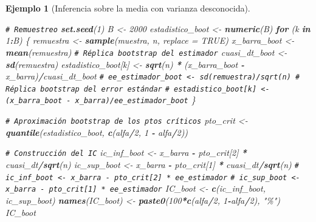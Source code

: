 \documentclass[
]{book}
\newenvironment{Shaded}{\begin{snugshade}}{\end{snugshade}}
\newcommand{\AttributeTok}[1]{\textcolor[rgb]{0.13,0.29,0.53}{#1}}
\newcommand{\CommentTok}[1]{\textcolor[rgb]{0.56,0.35,0.01}{\textit{#1}}}
\newcommand{\ConstantTok}[1]{\textcolor[rgb]{0.56,0.35,0.01}{#1}}
\newcommand{\ControlFlowTok}[1]{\textcolor[rgb]{0.13,0.29,0.53}{\textbf{#1}}}
\newcommand{\DecValTok}[1]{\textcolor[rgb]{0.00,0.00,0.81}{#1}}
\newcommand{\FunctionTok}[1]{\textcolor[rgb]{0.13,0.29,0.53}{\textbf{#1}}}
\newcommand{\NormalTok}[1]{#1}
\newcommand{\OtherTok}[1]{\textcolor[rgb]{0.56,0.35,0.01}{#1}}
\newcommand{\SpecialCharTok}[1]{\textcolor[rgb]{0.81,0.36,0.00}{\textbf{#1}}}
\newcommand{\StringTok}[1]{\textcolor[rgb]{0.31,0.60,0.02}{#1}}
\theoremstyle{break}
\newtheorem{example}{Ejemplo}[chapter]
\theoremstyle{nonumberplain}
\renewcommand{\CommentTok}[1]{\textcolor[rgb]{0.41,0.41,0.41}{\texttt{#1}}}
\begin{document}
\begin{example}[Inferencia sobre la media con varianza desconocida]
\begin{Shaded}
\begin{Highlighting}[]
\CommentTok{\# Remuestreo}
\FunctionTok{set.seed}\NormalTok{(}\DecValTok{1}\NormalTok{)}
\NormalTok{B }\OtherTok{\textless{}{-}} \DecValTok{2000}
\NormalTok{estadistico\_boot }\OtherTok{\textless{}{-}} \FunctionTok{numeric}\NormalTok{(B)}
\ControlFlowTok{for}\NormalTok{ (k }\ControlFlowTok{in} \DecValTok{1}\SpecialCharTok{:}\NormalTok{B) \{}
\NormalTok{  remuestra }\OtherTok{\textless{}{-}} \FunctionTok{sample}\NormalTok{(muestra, n, }\AttributeTok{replace =} \ConstantTok{TRUE}\NormalTok{)}
\NormalTok{  x\_barra\_boot }\OtherTok{\textless{}{-}} \FunctionTok{mean}\NormalTok{(remuestra) }\CommentTok{\# Réplica bootstrap del estimador}
\NormalTok{  cuasi\_dt\_boot }\OtherTok{\textless{}{-}} \FunctionTok{sd}\NormalTok{(remuestra)}
\NormalTok{  estadistico\_boot[k] }\OtherTok{\textless{}{-}} \FunctionTok{sqrt}\NormalTok{(n) }\SpecialCharTok{*}\NormalTok{ (x\_barra\_boot }\SpecialCharTok{{-}}\NormalTok{ x\_barra)}\SpecialCharTok{/}\NormalTok{cuasi\_dt\_boot}
  \CommentTok{\# ee\_estimador\_boot \textless{}{-} sd(remuestra)/sqrt(n) \# Réplica bootstrap del error estándar}
  \CommentTok{\# estadistico\_boot[k] \textless{}{-} (x\_barra\_boot {-} x\_barra)/ee\_estimador\_boot}
\NormalTok{\}}

\CommentTok{\# Aproximación bootstrap de los ptos críticos}
\NormalTok{pto\_crit }\OtherTok{\textless{}{-}} \FunctionTok{quantile}\NormalTok{(estadistico\_boot, }\FunctionTok{c}\NormalTok{(alfa}\SpecialCharTok{/}\DecValTok{2}\NormalTok{, }\DecValTok{1} \SpecialCharTok{{-}}\NormalTok{ alfa}\SpecialCharTok{/}\DecValTok{2}\NormalTok{))}

\CommentTok{\# Construcción del IC}
\NormalTok{ic\_inf\_boot }\OtherTok{\textless{}{-}}\NormalTok{ x\_barra }\SpecialCharTok{{-}}\NormalTok{ pto\_crit[}\DecValTok{2}\NormalTok{] }\SpecialCharTok{*}\NormalTok{ cuasi\_dt}\SpecialCharTok{/}\FunctionTok{sqrt}\NormalTok{(n)}
\NormalTok{ic\_sup\_boot }\OtherTok{\textless{}{-}}\NormalTok{ x\_barra }\SpecialCharTok{{-}}\NormalTok{ pto\_crit[}\DecValTok{1}\NormalTok{] }\SpecialCharTok{*}\NormalTok{ cuasi\_dt}\SpecialCharTok{/}\FunctionTok{sqrt}\NormalTok{(n)}
\CommentTok{\# ic\_inf\_boot \textless{}{-} x\_barra {-} pto\_crit[2] * ee\_estimador}
\CommentTok{\# ic\_sup\_boot \textless{}{-} x\_barra {-} pto\_crit[1] * ee\_estimador}
\NormalTok{IC\_boot }\OtherTok{\textless{}{-}} \FunctionTok{c}\NormalTok{(ic\_inf\_boot, ic\_sup\_boot)}
\FunctionTok{names}\NormalTok{(IC\_boot) }\OtherTok{\textless{}{-}} \FunctionTok{paste0}\NormalTok{(}\DecValTok{100}\SpecialCharTok{*}\FunctionTok{c}\NormalTok{(alfa}\SpecialCharTok{/}\DecValTok{2}\NormalTok{, }\DecValTok{1}\SpecialCharTok{{-}}\NormalTok{alfa}\SpecialCharTok{/}\DecValTok{2}\NormalTok{), }\StringTok{"\%"}\NormalTok{)}
\NormalTok{IC\_boot}
\end{Highlighting}
\end{Shaded}


\end{example}
\end{document}
